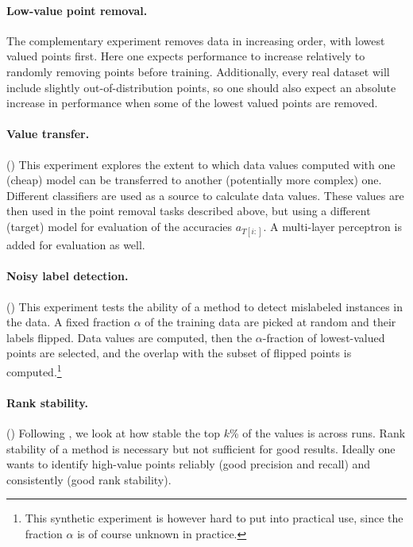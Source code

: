 \documentclass[10pt]{article}
\begin{document}
\paragraph{Low-value point removal.} The complementary experiment removes data
in increasing order, with lowest valued points first. Here one expects
performance to increase relatively to randomly removing points before
training. Additionally, every real dataset will include slightly
out-of-distribution points, so one should also expect an absolute increase in
performance when some of the lowest valued points are removed.

\paragraph{Value transfer.}() This experiment
explores the extent to which data values computed with one (cheap) model can
be transferred to another (potentially more complex) one. Different
classifiers are used as a source to calculate data values. These values are
then used in the point removal tasks described above, but using a different
(target) model for evaluation of the accuracies $a_{T [i :]}$. A multi-layer
perceptron is added for evaluation as well.

\paragraph{Noisy label detection.}() This experiment
tests the ability of a method to detect mislabeled instances in the data. A
fixed fraction $\alpha$ of the training data are picked at random and their
labels flipped. Data values are computed, then the $\alpha$-fraction of
lowest-valued points are selected, and the overlap with the subset of flipped
points is computed.\footnote{This synthetic experiment is however hard to put
into practical use, since the fraction $\alpha$ is of course unknown in
practice.}

\paragraph{Rank stability.}() Following
{\cite{wang_data_2023}}, we look at how stable the top $k$\% of the values is
across runs. Rank stability of a method is necessary but not sufficient for
good results. Ideally one wants to identify high-value points reliably (good
precision and recall) and consistently (good rank stability).
\end{document}
